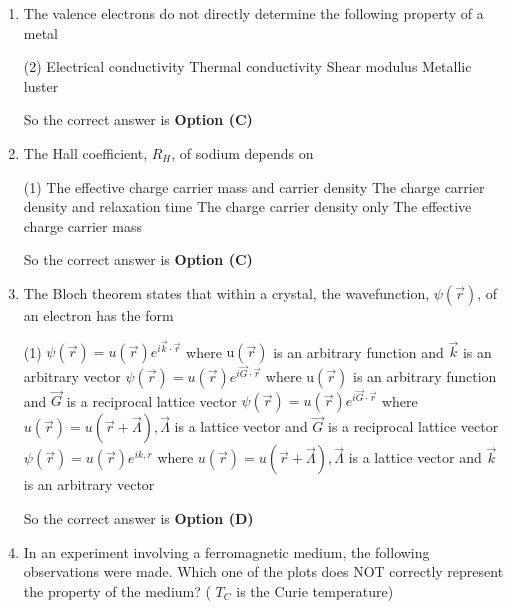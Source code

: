 \begin{enumerate}
	\item The valence electrons do not directly determine the following property of a metal
{	}
\begin{tasks}(2)
\task[\textbf{A.}] Electrical conductivity
\task[\textbf{B.}]  Thermal conductivity
\task[\textbf{C.}] Shear modulus
\task[\textbf{D.}] Metallic luster
\end{tasks}
\begin{answer}
So the correct answer is \textbf{Option (C)}
\end{answer}
	\item The Hall coefficient, $R_{H}$, of sodium depends on
{	}
\begin{tasks}(1)
\task[\textbf{A.}]  The effective charge carrier mass and carrier density
\task[\textbf{B.}] The charge carrier density and relaxation time
\task[\textbf{C.}]  The charge carrier density only
\task[\textbf{D.}] The effective charge carrier mass
\end{tasks}
\begin{answer}
So the correct answer is \textbf{Option (C)}
\end{answer}
	\item  The Bloch theorem states that within a crystal, the wavefunction, $\psi(\vec{r})$, of an electron has the form
{	}
\begin{tasks}(1)
\task[\textbf{A.}]  $\psi(\vec{r})=u(\vec{r}) e^{i \vec{k} \cdot \vec{r}}$ where $\mathrm{u}(\vec{r})$ is an arbitrary function and $\vec{k}$ is an arbitrary vector
\task[\textbf{B.}]  $\psi(\vec{r})=u(\vec{r}) e^{i \vec{G} \cdot \vec{r}}$ where $\mathrm{u}(\vec{r})$ is an arbitrary function and $\vec{G}$ is a reciprocal lattice vector
\task[\textbf{C.}]  $\psi(\vec{r})=u(\vec{r}) e^{i \vec{G} \cdot \vec{r}}$ where $u(\vec{r})=u(\vec{r}+\vec{\Lambda}), \vec{\Lambda}$ is a lattice vector and $\vec{G}$ is a reciprocal lattice vector
\task[\textbf{D.}]  $\psi(\vec{r})=u(\vec{r}) e^{i k, r}$ where $u(\vec{r})=u(\vec{r}+\vec{\Lambda}), \vec{\Lambda}$ is a lattice vector and $\vec{k}$ is an arbitrary vector
\end{tasks}
\begin{answer}
So the correct answer is \textbf{Option (D)}
\end{answer}
	\item In an experiment involving a ferromagnetic medium, the following observations were made. Which one of the plots does NOT correctly represent the property of the medium? ( $T_{C}$ is the Curie temperature)

\end{enumerate}
